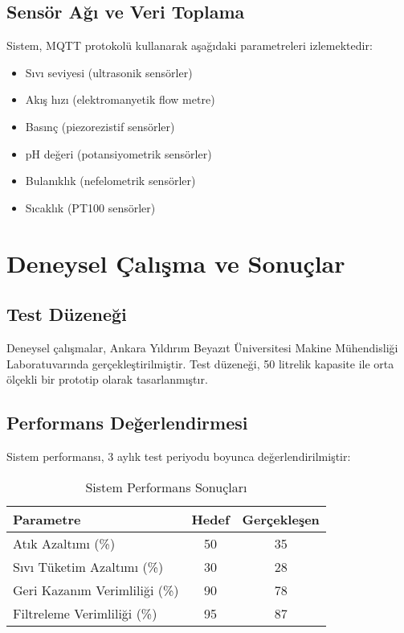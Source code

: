 \documentclass[12pt,a4paper]{article}
\begin{document}
\subsection{Sensör Ağı ve Veri Toplama}

Sistem, MQTT protokolü kullanarak aşağıdaki parametreleri izlemektedir:

\begin{itemize}
\item Sıvı seviyesi (ultrasonik sensörler)
\item Akış hızı (elektromanyetik flow metre)
\item Basınç (piezorezistif sensörler)
\item pH değeri (potansiyometrik sensörler)
\item Bulanıklık (nefelometrik sensörler)
\item Sıcaklık (PT100 sensörler)
\end{itemize}

\section{Deneysel Çalışma ve Sonuçlar}

\subsection{Test Düzeneği}

Deneysel çalışmalar, Ankara Yıldırım Beyazıt Üniversitesi Makine Mühendisliği Laboratuvarında gerçekleştirilmiştir. Test düzeneği, 50 litrelik kapasite ile orta ölçekli bir prototip olarak tasarlanmıştır.

\subsection{Performans Değerlendirmesi}

Sistem performansı, 3 aylık test periyodu boyunca değerlendirilmiştir:

\begin{table}[H]
\centering
\caption{Sistem Performans Sonuçları}
\begin{tabular}{lcc}
\toprule
\textbf{Parametre} & \textbf{Hedef} & \textbf{Gerçekleşen} \\
\midrule
Atık Azaltımı (\%) & 50 & 35 \\
Sıvı Tüketim Azaltımı (\%) & 30 & 28 \\
Geri Kazanım Verimliliği (\%) & 90 & 78 \\
Filtreleme Verimliliği (\%) & 95 & 87 \\
\bottomrule
\end{tabular}
\end{table}
\end{document}
